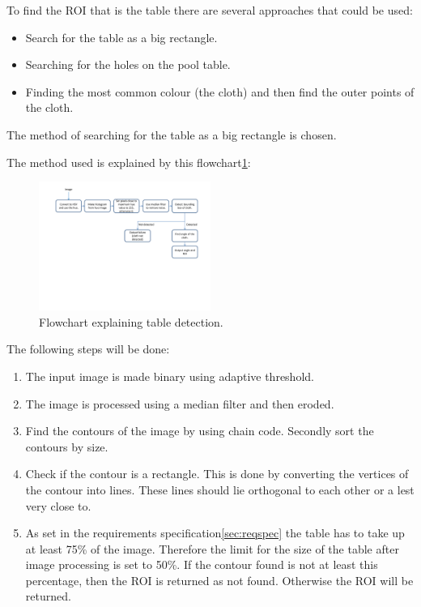 To find the ROI that is the table there are several approaches that could be used:
\begin{itemize}
	\item Search for the table as a big rectangle.
	\item Searching for the holes on the pool table.
	\item Finding the most common colour (the cloth) and then find the outer points of the cloth.
\end{itemize}

The method of searching for the table as a big rectangle is chosen. 					%

The method used is explained by this flowchart\ref{fig:detecttable_flowchart}:

\begin{figure}[H]
\begin{center}
\leavevmode
\includegraphics[width=0.5\textwidth]{images/tabledetect_flowchart.pdf}
\end{center}
\caption{Flowchart explaining table detection.}
\label{fig:detecttable_flowchart}
\end{figure}

The following steps will be done:
\begin{enumerate}

\item The input image is made binary using adaptive threshold.

\item The image is processed using a median filter and then eroded.

\item Find the contours of the image by using chain code. Secondly sort the contours by size.

\item Check if the contour is a rectangle. This is done by converting the vertices of the contour into lines. These lines should lie orthogonal to each other or a lest very close to.

\item As set in the requirements specification\ref{sec:reqspec} the table has to take up at least 75\% of the image. Therefore the limit for the size of the table after image processing is set to 50\%. If the contour found is not at least this percentage, then the ROI is returned as not found. Otherwise the ROI will be returned.
\end{enumerate}

